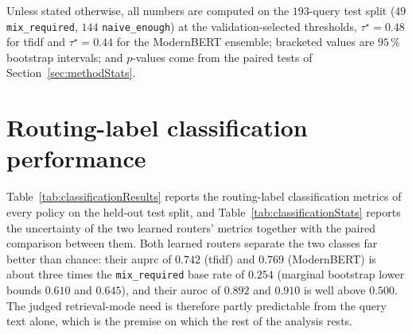 \documentclass[english, bibtex]{kththesis}               %
\numberwithin{listing}{chapter}
\begin{document}
Unless stated otherwise, all numbers are computed on the $193$-query test split ($49$ \texttt{mix\_required}, $144$ \texttt{naive\_enough}) at the validation-selected thresholds, $\tau^\star = 0.48$ for \gls{tfidf} and $\tau^\star = 0.44$ for the ModernBERT ensemble; bracketed values are $95\,\%$ bootstrap intervals; and $p$-values come from the paired tests of Section~\ref{sec:methodStats}.

\section{Routing-label classification performance}
\label{sec:resultsClassification}

Table~\ref{tab:classificationResults} reports the routing-label classification metrics of every policy on the held-out test split, and Table~\ref{tab:classificationStats} reports the uncertainty of the two learned routers' metrics together with the paired comparison between them. Both learned routers separate the two classes far better than chance: their \gls{auprc} of $0.742$ (\gls{tfidf}) and $0.769$ (ModernBERT) is about three times the \texttt{mix\_required} base rate of $0.254$ (marginal bootstrap lower bounds $0.610$ and $0.645$), and their \gls{auroc} of $0.892$ and $0.910$ is well above $0.500$. The judged retrieval-mode need is therefore partly predictable from the query text alone, which is the premise on which the rest of the analysis rests.
\end{document}
